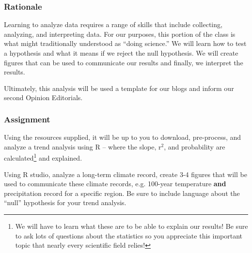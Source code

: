 
\subsubsection{Rationale}

Learning to analyze data requires a range of skills that include collecting, analyzing, and interpreting data. For our purposes, this portion of the class is what might traditionally understood as ``doing science.'' We will learn how to test a hypothesis and what it means if we reject the null hypothesis. We will create figures that can be used to communicate our results and finally, we interpret the results. 

Ultimately, this analysis will be used a template for our blogs and inform our second Opinion Editorials. 

\subsubsection{Assignment}

Using the resources supplied, it will be up to you to download, pre-process, and analyze a trend analysis using R -- where the slope, r$^2$, and probability are calculated\footnote{We will have to learn what these are to be able to explain our results! Be sure to ask lots of questions about the statistics so you appreciate this important topic that nearly every scientific field relies!} and explained. 

Using R studio, analyze a long-term climate record, create 3-4 figures that will be used to communicate these climate records, e.g. 100-year temperature \textbf{and} precipitation record for a specific region. Be sure to include language about the ``null'' hypothesis for your trend analysis.

  


